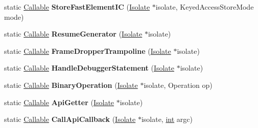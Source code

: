 \begin{DoxyCompactItemize}
static \mbox{\hyperlink{classv8_1_1internal_1_1Callable}{Callable}} {\bfseries Store\+Fast\+Element\+IC} (\mbox{\hyperlink{classv8_1_1internal_1_1Isolate}{Isolate}} $\ast$isolate, Keyed\+Access\+Store\+Mode mode)
\item 
\mbox{\label{classv8_1_1internal_1_1CodeFactory_a8cfadda62cfb82e66cc05c462a2d73e8}} 
static \mbox{\hyperlink{classv8_1_1internal_1_1Callable}{Callable}} {\bfseries Resume\+Generator} (\mbox{\hyperlink{classv8_1_1internal_1_1Isolate}{Isolate}} $\ast$isolate)
\item 
\mbox{\label{classv8_1_1internal_1_1CodeFactory_a08e741cdb1df3d8dd2cd301cf04b161a}} 
static \mbox{\hyperlink{classv8_1_1internal_1_1Callable}{Callable}} {\bfseries Frame\+Dropper\+Trampoline} (\mbox{\hyperlink{classv8_1_1internal_1_1Isolate}{Isolate}} $\ast$isolate)
\item 
\mbox{\label{classv8_1_1internal_1_1CodeFactory_a3729ad2ca3a9e5de223999669dd7a1af}} 
static \mbox{\hyperlink{classv8_1_1internal_1_1Callable}{Callable}} {\bfseries Handle\+Debugger\+Statement} (\mbox{\hyperlink{classv8_1_1internal_1_1Isolate}{Isolate}} $\ast$isolate)
\item 
\mbox{\label{classv8_1_1internal_1_1CodeFactory_a4d89558071f972949ded7bef36e9bcab}} 
static \mbox{\hyperlink{classv8_1_1internal_1_1Callable}{Callable}} {\bfseries Binary\+Operation} (\mbox{\hyperlink{classv8_1_1internal_1_1Isolate}{Isolate}} $\ast$isolate, Operation op)
\item 
\mbox{\label{classv8_1_1internal_1_1CodeFactory_a47b9d57a1647b6c92f15639ca6ba4223}} 
static \mbox{\hyperlink{classv8_1_1internal_1_1Callable}{Callable}} {\bfseries Api\+Getter} (\mbox{\hyperlink{classv8_1_1internal_1_1Isolate}{Isolate}} $\ast$isolate)
\item 
\mbox{\label{classv8_1_1internal_1_1CodeFactory_a42f007055544c0df60efde843fa7580a}} 
static \mbox{\hyperlink{classv8_1_1internal_1_1Callable}{Callable}} {\bfseries Call\+Api\+Callback} (\mbox{\hyperlink{classv8_1_1internal_1_1Isolate}{Isolate}} $\ast$isolate, \mbox{\hyperlink{classint}{int}} argc)

\end{DoxyCompactItemize}
